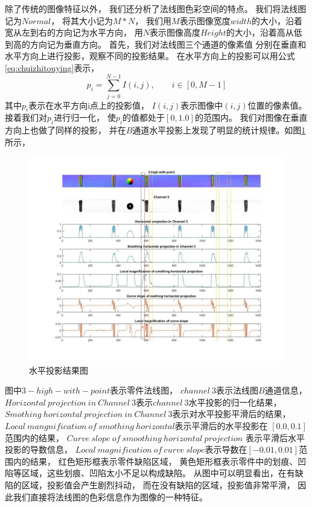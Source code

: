 除了传统的图像特征以外，
我们还分析了法线图色彩空间的特点。
我们将法线图记为$Normal$，
将其大小记为$M*N$，
我们用$M$表示图像宽度$width$的大小，沿着宽从左到右的方向记为水平方向，
用$N$表示图像高度$Height$的大小，沿着高从低到高的方向记为垂直方向。
首先，我们对法线图三个通道的像素值
分别在垂直和水平方向上进行投影，观察不同的投影结果。
在水平方向上的投影可以用公式
\eqref{eq:chuizhitouying}表示，
\begin{equation}
p_i=\sum_{j=0}^{N-1} I(i,j),\qquad i\in \left[ 0,M-1\right]
\label{eq:chuizhitouying}
\end{equation}
其中$p_i$表示在水平方向i点上的投影值，
$I(i,j)$表示图像中$(i,j)$位置的像素值。
接着我们对$p_i$进行归一化，
使$p_i$的值都处于$[0,1.0]$的范围内。
我们对图像在垂直方向上也做了同样的投影，
并在$B$通道水平投影上发现了明显的统计规律。如图\ref{fig:secaitongying}所示，
\begin{figure}[htbp]
\centering
\includegraphics[width=1.0\linewidth]{figures/secaikongjian.png}
\caption{水平投影结果图}
\label{fig:secaitongying}
\end{figure}
图中$3-high-with-point$表示零件法线图，
$channel~3$表示法线图$B$通道信息，
$Horizontal~projection~in~Channel~3$表示$channel~3$水平投影的归一化结果，
$Smothing~horizontal~projection~in~Channel~3$表示对水平投影平滑后的结果，
$Local~mangnification~of~smothing~horizontal$表示平滑后的水平投影在
$[0.0,0.1]$范围内的结果，
$Curve~slope~of~smoothing~horizontal~projection$
表示平滑后水平投影的导数信息，
$Local~magnification~of~curve~slope$表示导数在$[-0.01,0.01]$范围内的结果，
红色矩形框表示零件缺陷区域，
黄色矩形框表示零件中的划痕、凹陷等区域，这些划痕、凹陷太小不足以构成缺陷。
从图中可以明显看出，在有缺陷的区域，投影值会产生剧烈抖动，
而在没有缺陷的区域，投影值非常平滑，
因此我们直接将法线图的色彩信息作为图像的一种特征。

